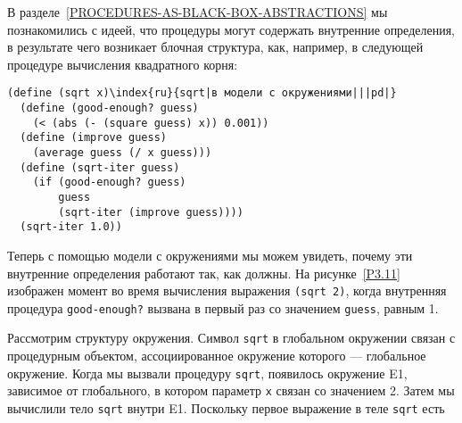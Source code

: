 \begin{cntrfig}

\caption{Процедура {\tt sqrt} с внутренними определениями.}
\label{P3.11}

\end{cntrfig}

В разделе~\ref{PROCEDURES-AS-BLACK-BOX-ABSTRACTIONS} мы
познакомились с идеей, что процедуры могут содержать внутренние
определения, в результате чего возникает блочная структура, как, например, в
следующей процедуре вычисления квадратного корня:

\begin{Verbatim}[fontsize=\small]
(define (sqrt x)\index{ru}{sqrt|в модели с окружениями|||pd|}
  (define (good-enough? guess)
    (< (abs (- (square guess) x)) 0.001))
  (define (improve guess)
    (average guess (/ x guess)))
  (define (sqrt-iter guess)
    (if (good-enough? guess)
        guess
        (sqrt-iter (improve guess))))
  (sqrt-iter 1.0))
\end{Verbatim}
Теперь с помощью модели с окружениями мы можем увидеть, почему эти
внутренние определения работают так, как должны.  На
рисунке~\ref{P3.11} изображен момент во время вычисления выражения
{\tt (sqrt 2)}, когда внутренняя процедура
{\tt good-enough?} вызвана в первый раз со значением
{\tt guess}, равным 1.

Рассмотрим структуру окружения. Символ {\tt sqrt} в
глобальном окружении связан с процедурным объектом, ассоциированное
окружение которого --- глобальное окружение.  Когда мы вызвали
процедуру {\tt sqrt}, появилось окружение E1, зависимое от
глобального, в котором параметр {\tt x} связан со значением 2.
Затем мы вычислили тело {\tt sqrt} внутри E1.  Поскольку
первое выражение в теле {\tt sqrt} есть

